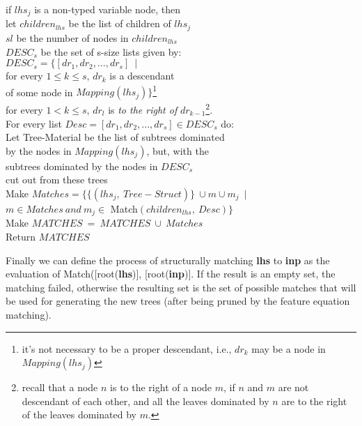 \begin{tabbing}
\>\>\>\> if $lhs_j$ is a non-typed variable node, then \\

\>\>\>\>\> let \>$children_{lhs}$ be the list of children of $lhs_j$ \\
\>\>\>\>\> \> $sl$ be the number of nodes in $children_{lhs}$ \\

\>\>\>\>\>\> $DESC_s$ be the set of s-size lists given by: \\
\>\>\>\>\>\>\>\> $DESC_s=\{[dr_1,dr_2,...,dr_s]\ \mid\ $ \\
\>\>\>\>\>\>\>\>\>\> for every $1 \leq k \leq s$, $dr_k$ is a descendant \\
\>\>\>\>\>\>\>\>\>\>\>\> of
                        some node in $Mapping(lhs_j)\}$\footnote{it's not 
                necessary to be a proper descendant,
                i.e., $dr_k$ may be a node in $Mapping(lhs_j)$}\\
\>\>\>\>\>\>\>\>\>\> for every $1 < k \leq s$, $dr_l$ is {\it to the right of}
                        $dr_{k-1}$\footnote{recall that a node 
$n$ is to the right of a node $m$, if $n$ and $m$ are not descendant of each
other, and all the leaves dominated by $n$ are to the right of the leaves
dominated by $m$.}.\\

\>\>\>\>\>\> For every list $Desc=[dr_1,dr_2,...,dr_s] \in DESC_s$ do: \\

\>\>\>\>\>\>\> Let Tree-Material be the list of subtrees dominated \\
\>\>\>\>\>\>\>\>\> by the nodes in $Mapping(lhs_j)$, but, with the \\
\>\>\>\>\>\>\>\>\> subtrees dominated by the nodes in $DESC_s$ \\
\>\>\>\>\>\>\>\>\> cut out from these trees \\

\>\>\>\>\>\>\> Make $Matches=\{\{(lhs_j,\ Tree-Struct)\}\ \cup 
        m\cup m_j\ \mid$ \\
\>\>\>\>\>\>\>\>\> $m\in Matches\ and\ 
        m_j\in$ Match$(children_{lhs},\ Desc)\}$ \\ 

\>\>\> Make $MATCHES\ =\ MATCHES\ \cup\ Matches$ \\

\>\> Return $MATCHES$

\end{tabbing}

Finally we can define the process of structurally matching {\bf lhs} to
{\bf inp} as the evaluation of Match([root({\bf lhs})], [root({\bf inp})].
If the result is an empty set, the matching failed, otherwise the resulting
set is the set of possible matches that will be used for generating the
new trees (after being pruned by the feature equation matching).

